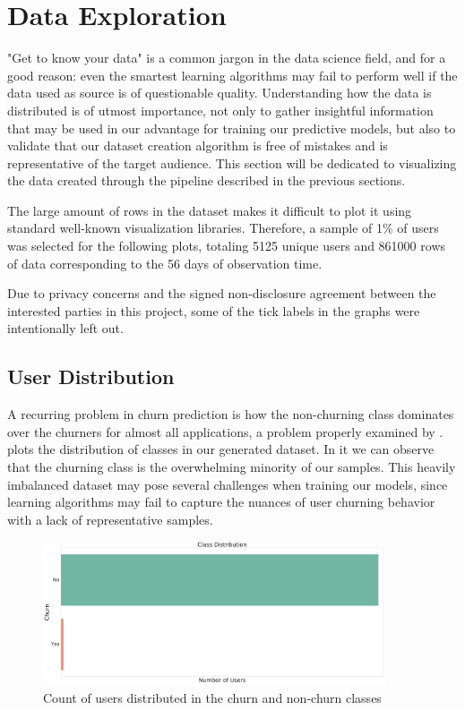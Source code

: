 \documentclass{kththesis}
\begin{document}
\section{Data Exploration}

"Get to know your data" is a common jargon in the data science field, and for a good reason: even the smartest learning algorithms may fail to perform well if the data used as source is of questionable quality. Understanding how the data is distributed is of utmost importance, not only to gather insightful information that may be used in our advantage for training our predictive models, but also to validate that our dataset creation algorithm is free of mistakes and is representative of the target audience. This section will be dedicated to visualizing the data created through the pipeline described in the previous sections.

The large amount of rows in the dataset makes it difficult to plot it using standard well-known visualization libraries. Therefore, a sample of 1\% of users was selected for the following plots, totaling 5125 unique users and 861000 rows of data corresponding to the 56 days of observation time.

Due to privacy concerns and the signed non-disclosure agreement between the interested parties in this project, some of the tick labels in the graphs were intentionally left out.

\subsection{User Distribution}

A recurring problem in churn prediction is how the non-churning class dominates over the churners for almost all applications, a problem properly examined by \citep{Burez2009}.  plots the distribution of classes in our generated dataset. In it we can observe that the churning class is the overwhelming minority of our samples. This heavily imbalanced dataset may pose several challenges when training our models, since learning algorithms may fail to capture the nuances of user churning behavior with a lack of representative samples.

	\begin{figure}[H]
    \centering
    \includegraphics[width=0.9\textwidth,height=0.9\textheight,keepaspectratio]{figures/class_dist.pdf}
    \caption{Count of users distributed in the churn and non-churn classes}
    \label{fig:classdist}
	\end{figure}
\end{document}

